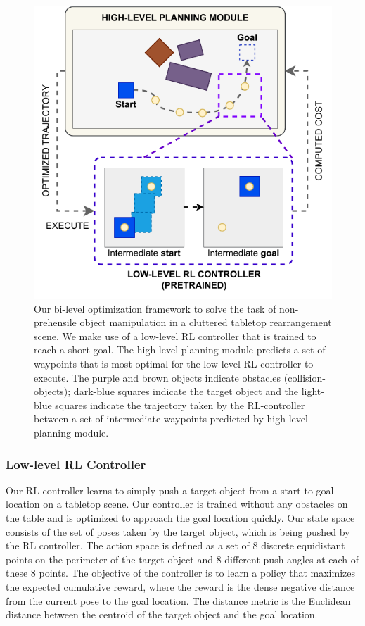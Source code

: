 \begin{figure}
    \centering \includegraphics[scale=0.8]{figures/bl-manipulator/pipeline.v9.pdf} 
    \caption[Bi-level optimization pipeline]{Our bi-level optimization framework to solve the task of non-prehensile object manipulation in a cluttered tabletop rearrangement scene. We make use of a low-level RL controller that is trained to reach a short goal. The high-level planning module predicts a set of waypoints that is most optimal for the low-level RL controller to execute. The purple and brown objects indicate obstacles (collision-objects); dark-blue squares indicate the target object and the light-blue squares indicate the trajectory taken by the RL-controller between a set of intermediate waypoints predicted by high-level planning module.}
    \label{fig:pipeline}
\end{figure}

\subsubsection{Low-level RL Controller}
\label{sec:low-level-rl}

Our RL controller learns to simply push a target object from a start to goal location on a tabletop scene. Our controller is trained without any obstacles on the table and is optimized to approach the goal location quickly. Our state space consists of the set of poses taken by the target object, which is being pushed by the RL controller. The action space is defined as a set of 8 discrete equidistant points on the perimeter of the target object and 8 different push angles at each of these 8 points. The objective of the controller is to learn a policy that maximizes the expected cumulative reward, where the reward is the dense negative distance from the current pose to the goal location. The distance metric is the Euclidean distance between the centroid of the target object and the goal location.

